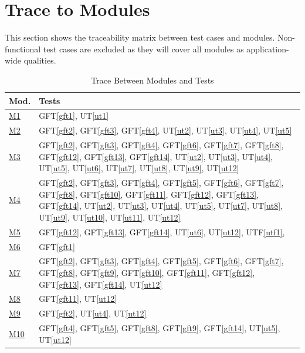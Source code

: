 \documentclass[12pt, titlepage]{article}
\begin{document}
\section{Trace to Modules}
This section shows the traceability matrix between test cases and modules. Non-functional test cases are excluded as they will cover all modules as application-wide qualities.		

\begin{table}[H]
\centering
\begin{tabular}{p{} p{}}
\toprule
\textbf{Mod.} & \textbf{Tests}\\
\midrule
\href{../Design/MG/MG.pdf#m1}{M1} & GFT\ref{gft1}, UT\ref{ut1}\\
\href{../Design/MG/MG.pdf#m2}{M2} & GFT\ref{gft2}, GFT\ref{gft3}, GFT\ref{gft4},  UT\ref{ut2},  UT\ref{ut3},  UT\ref{ut4},  UT\ref{ut5}\\
\href{../Design/MG/MG.pdf#m3}{M3} & GFT\ref{gft2}, GFT\ref{gft3}, GFT\ref{gft4}, GFT\ref{gft6}, GFT\ref{gft7}, GFT\ref{gft8}, GFT\ref{gft12}, GFT\ref{gft13}, GFT\ref{gft14}, UT\ref{ut2}, UT\ref{ut3}, UT\ref{ut4}, UT\ref{ut5}, UT\ref{ut6}, UT\ref{ut7}, UT\ref{ut8}, UT\ref{ut9}, UT\ref{ut12}\\
\href{../Design/MG/MG.pdf#m4}{M4} & GFT\ref{gft2}, GFT\ref{gft3}, GFT\ref{gft4}, GFT\ref{gft5}, GFT\ref{gft6}, GFT\ref{gft7}, GFT\ref{gft8}, GFT\ref{gft10}, GFT\ref{gft11}, GFT\ref{gft12}, GFT\ref{gft13}, GFT\ref{gft14}, UT\ref{ut2}, UT\ref{ut3}, UT\ref{ut4}, UT\ref{ut5}, UT\ref{ut7}, UT\ref{ut8}, UT\ref{ut9}, UT\ref{ut10}, UT\ref{ut11}, UT\ref{ut12}\\
\href{../Design/MG/MG.pdf#m5}{M5} & GFT\ref{gft12}, GFT\ref{gft13}, GFT\ref{gft14}, UT\ref{ut6}, UT\ref{ut12}, UTF\ref{utf1},\\
\href{../Design/MG/MG.pdf#m6}{M6} & GFT\ref{gft1}\\
\href{../Design/MG/MG.pdf#m7}{M7} & GFT\ref{gft2}, GFT\ref{gft3}, GFT\ref{gft4}, GFT\ref{gft5}, GFT\ref{gft6}, GFT\ref{gft7}, GFT\ref{gft8}, GFT\ref{gft9}, GFT\ref{gft10}, GFT\ref{gft11}, GFT\ref{gft12}, GFT\ref{gft13}, GFT\ref{gft14}, UT\ref{ut12}\\
\href{../Design/MG/MG.pdf#m8}{M8} & GFT\ref{gft11}, UT\ref{ut12}\\
\href{../Design/MG/MG.pdf#m9}{M9} & GFT\ref{gft2}, UT\ref{ut4}, UT\ref{ut12}\\
\href{../Design/MG/MG.pdf#m10}{M10} & GFT\ref{gft4}, GFT\ref{gft5}, GFT\ref{gft8}, GFT\ref{gft9}, GFT\ref{gft14}, UT\ref{ut5}, UT\ref{ut12}\\
\bottomrule
\end{tabular}
\caption{Trace Between Modules and Tests}
\label{TblMT}
\end{table}
\end{document}
